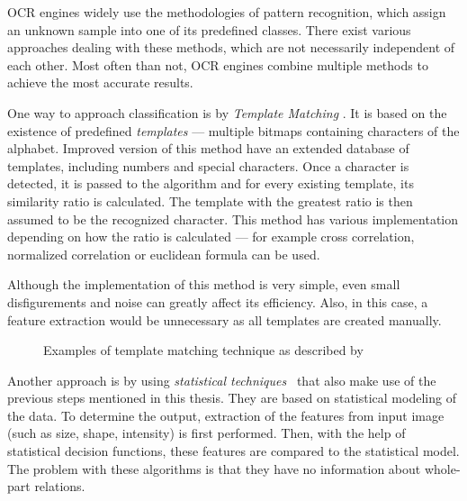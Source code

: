 OCR engines widely use the methodologies of pattern recognition, which assign an unknown sample into one of its predefined classes. There exist various approaches dealing with these methods, which are not necessarily independent of each other. Most often than not, OCR engines combine multiple methods to achieve the most accurate results.

One way to approach classification is by \emph{Template Matching} \citep{templateMatching}. It is based on the existence of predefined \emph{templates} --- multiple bitmaps containing characters of the alphabet. Improved version of this method have an extended database of templates, including numbers and special characters. Once a character is detected, it is passed to the algorithm and for every existing template, its similarity ratio is calculated. The template with the greatest ratio is then assumed to be the recognized character. This method has various implementation depending on how the ratio is calculated --- for example cross correlation, normalized correlation or euclidean formula can be used.

Although the implementation of this method is very simple, even small disfigurements and noise can greatly affect its efficiency. Also, in this case, a feature extraction would be unnecessary as all templates are created manually.

\begin{figure}[t]
    \noindent
	\caption{Examples of template matching technique as described by \citet{Ning1993AnIO}}
	\label{fig:mff}
\end{figure}

Another approach is by using \emph{statistical techniques}~\citep{characterClassification} that also make use of the previous steps mentioned in this thesis. They are based on statistical modeling of the data. To determine the output, extraction of the features from input image (such as size, shape, intensity) is first performed. Then, with the help of statistical decision functions, these features are compared to the statistical model. The problem with these algorithms is that they have no information about whole-part relations. 

